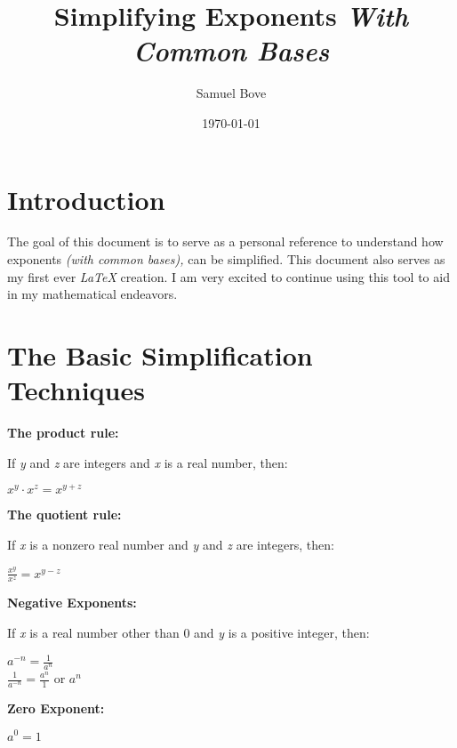 \documentclass[12pt, letterpaper]{article}
\title{Simplifying Exponents \textit{With Common Bases}}
\author{Samuel Bove}
\date{\today}
\begin{document}
	
	
	\maketitle


	\section{Introduction}
	The goal of this document is to serve as a personal reference to understand how exponents \emph{(with common bases),} can be simplified. This document also serves as my first ever \emph{LaTeX} creation. I am very excited to continue using this tool to aid in my mathematical endeavors.
	
	\section{The Basic Simplification Techniques}
	
	\centering
	\textbf{The product rule:}
	
	If \textit{y} and \textit{z} are integers and \textit{x} is a real number, then:
	
	$x^y \cdot x^z = x^{y+z}$
	
	\textbf{The quotient rule:}
	
	If \textit{x} is a nonzero real number and \textit{y} and \textit{z} are integers, then:
	
	$\frac{x^y}{x^z} = x^{y-z}$
	
	\textbf{Negative Exponents:}
	
	If \textit{x} is a real number other than 0 and \textit{y} is a positive integer, then:
	
	$a^{-n}=\frac{1}{a^n}$ \\ $\frac{1}{a^{-n}}=\frac{a^n}{1}$ or $a^n$
	
	\textbf{Zero Exponent:}
	
	$a^0 = 1$
	
	
	
	
	
	
	

	
	
	
	
	
\end{document}
